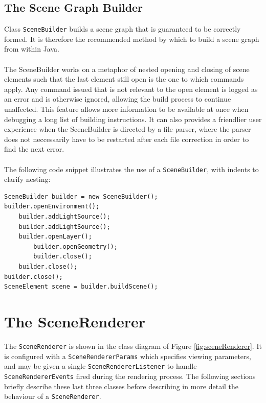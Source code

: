 \documentclass[10pt,aps, prb,preprint]{article}
\begin{document}
\subsection{The Scene Graph Builder}
Class \texttt{SceneBuilder} builds a scene graph that is guaranteed to be correctly formed. It is therefore the recommended method by which to build a scene graph from within Java.
\\
\\
The SceneBuilder works on a metaphor of nested opening and closing of scene elements such that the last element still open is the one to which commands apply. Any command issued that is not relevant to the open element is logged as an error and is otherwise ignored, allowing the build process to continue unaffected. This feature allows more information to be available at once when debugging a long list of building instructions. It can also provides a friendlier user experience when the SceneBuilder is directed by a file parser, where the parser does not neccessarily have to be restarted after each file correction in order to find the next error.
\\
\\
The following code snippet illustrates the use of a \texttt{SceneBuilder}, with indents to clarify nesting:

\begin{verbatim}
SceneBuilder builder = new SceneBuilder();
builder.openEnvironment();
    builder.addLightSource();
    builder.addLightSource();
    builder.openLayer();
        builder.openGeometry();
        builder.close();
    builder.close();
builder.close();
SceneElement scene = builder.buildScene();
\end{verbatim}


\newpage
\section{The SceneRenderer}
\label{SceneRenderer}
The \texttt{SceneRenderer} is shown in the class diagram of Figure \ref{fig:sceneRenderer}. It is configured with a \texttt{SceneRendererParams} which specifies viewing parameters, and may be given a single \texttt{SceneRendererListener} to handle \texttt{SceneRendererEvents} fired during the rendering process. The following sections briefly describe these last three classes before describing in more detail the behaviour of a \texttt{SceneRenderer}.
\end{document}
